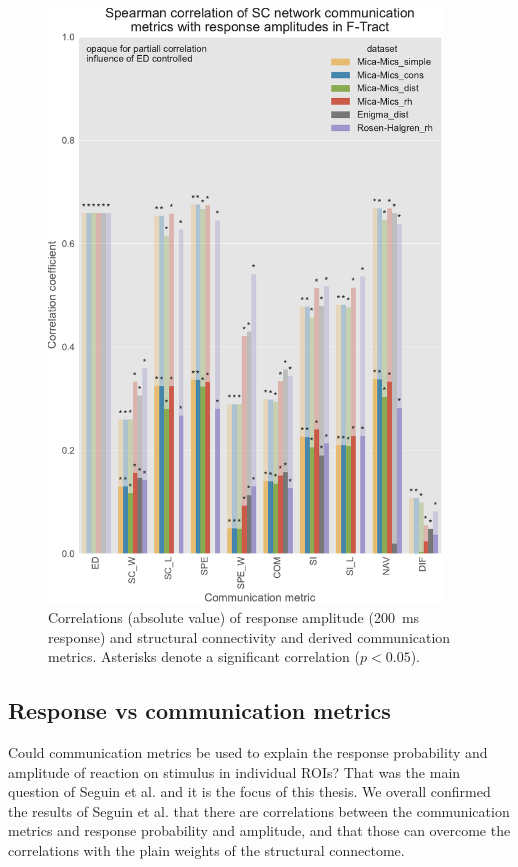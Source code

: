 \begin{figure}
    \centering
    \includegraphics[width=0.93\textwidth]{images/nootebook_generated/ftract_results/MNI-HCP-MMP1/5/ED0/0.25/long/Spearman_correlation_of_SC_network_communication_metrics_with_response_amplitudes_in_F-Tract.pdf}
    \caption[F-Tract amplitude correlations - all $SC$ matrices]{Correlations (absolute value) of response amplitude (200~ms response) and structural connectivity and derived communication metrics. Asterisks denote a significant correlation ($p<0.05$).}
    \label{fig:ftract_alldata_long_amplitudes}
\end{figure}


\subsection{Response vs communication metrics}

Could communication metrics be used to explain the response probability and amplitude of reaction on stimulus in individual ROIs? That was the main question of Seguin et al. \cite{seguin_communication_2023} and it is the focus of this thesis. We overall confirmed the results of Seguin et al. that there are correlations between the communication metrics and response probability and amplitude, and that those can overcome the correlations with the plain weights of the structural connectome. 

